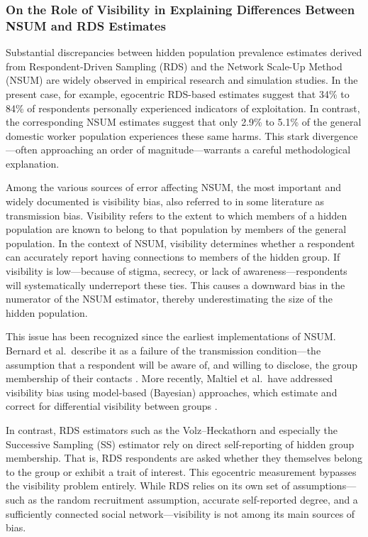 \documentclass[
  12pt,
  letterpaper,
  DIV=11,
  numbers=noendperiod]{scrartcl}
\theoremstyle{plain}
\theoremstyle{definition}
\begin{document}
\subsubsection{On the Role of Visibility in Explaining Differences
Between NSUM and RDS
Estimates}\label{on-the-role-of-visibility-in-explaining-differences-between-nsum-and-rds-estimates}

Substantial discrepancies between hidden population prevalence estimates
derived from Respondent-Driven Sampling (RDS) and the Network Scale-Up
Method (NSUM) are widely observed in empirical research and simulation
studies. In the present case, for example, egocentric RDS-based
estimates suggest that 34\% to 84\% of respondents personally
experienced indicators of exploitation. In contrast, the corresponding
NSUM estimates suggest that only 2.9\% to 5.1\% of the general domestic
worker population experiences these same harms. This stark
divergence---often approaching an order of magnitude---warrants a
careful methodological explanation.

Among the various sources of error affecting NSUM, the most important
and widely documented is visibility bias, also referred to in some
literature as transmission bias. Visibility refers to the extent to
which members of a hidden population are known to belong to that
population by members of the general population. In the context of NSUM,
visibility determines whether a respondent can accurately report having
connections to members of the hidden group. If visibility is
low---because of stigma, secrecy, or lack of awareness---respondents
will systematically underreport these ties. This causes a downward bias
in the numerator of the NSUM estimator, thereby underestimating the size
of the hidden population.

This issue has been recognized since the earliest implementations of
NSUM. Bernard et al.~describe it as a failure of the transmission
condition---the assumption that a respondent will be aware of, and
willing to disclose, the group membership of their contacts
\autocite{bern10-counting}. More recently, Maltiel et al.~have addressed
visibility bias using model-based (Bayesian) approaches, which estimate
and correct for differential visibility between groups
\autocite{malt15-estimating}.

In contrast, RDS estimators such as the Volz--Heckathorn and especially
the Successive Sampling (SS) estimator rely on direct self-reporting of
hidden group membership. That is, RDS respondents are asked whether they
themselves belong to the group or exhibit a trait of interest. This
egocentric measurement bypasses the visibility problem entirely. While
RDS relies on its own set of assumptions---such as the random
recruitment assumption, accurate self-reported degree, and a
sufficiently connected social network---visibility is not among its main
sources of bias.
\end{document}
